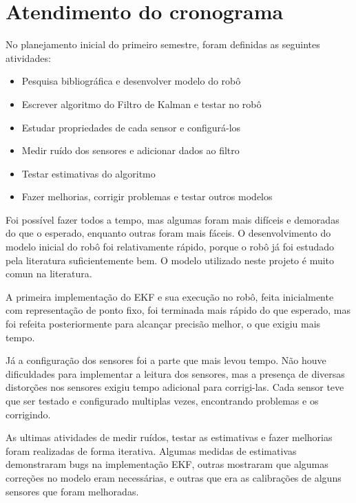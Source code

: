 \documentclass[
	12pt,				%
	openright,			%
	twoside,			%
	convert,
	a4paper,			%
	english,			%
	french,				%
	spanish,			%
	brazil				%
	]{abntex2}
\begin{document}
\section{Atendimento do cronograma}
No planejamento inicial do primeiro semestre, foram definidas as seguintes atividades:
\begin{itemize}
	\item Pesquisa bibliográfica e desenvolver modelo do robô
	\item Escrever algoritmo do Filtro de Kalman e testar no robô
	\item Estudar propriedades de cada sensor e configurá-los
	\item Medir ruído dos sensores e adicionar dados ao filtro
	\item Testar estimativas do algoritmo
	\item Fazer melhorias, corrigir problemas e testar outros modelos
\end{itemize}

Foi possível fazer todos a tempo, mas algumas foram mais difíceis e demoradas do que o esperado, enquanto outras foram mais fáceis. 
O desenvolvimento do modelo inicial do robô foi relativamente rápido, porque o robô já foi estudado pela literatura suficientemente bem. O modelo utilizado neste projeto é muito comun na literatura.
\par
A primeira implementação do EKF e sua execução no robô, feita inicialmente com representação de ponto fixo, foi terminada mais rápido do que esperado, mas foi refeita posteriormente para alcançar precisão melhor, o que exigiu mais tempo.
\par
Já a configuração dos sensores foi a parte que mais levou tempo. Não houve dificuldades para implementar a leitura dos sensores, mas a presença de diversas distorções nos sensores exigiu tempo adicional para corrigi-las. Cada sensor teve que ser testado e configurado multiplas vezes, encontrando problemas e os corrigindo.
\par
As ultimas atividades de medir ruídos, testar as estimativas e fazer melhorias foram realizadas de forma iterativa. Algumas medidas de estimativas demonstraram bugs na implementação EKF, outras mostraram que algumas correções no modelo eram necessárias, e outras que era as calibrações de alguns sensores que foram melhoradas.
\end{document}
